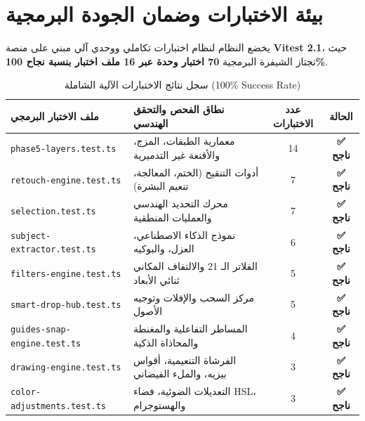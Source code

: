 \documentclass[12pt,a4paper]{report}
\begin{document}
\chapter{بيئة الاختبارات وضمان الجودة البرمجية}

يخضع النظام لنظام اختبارات تكاملي ووحدي آلي مبني على منصة \textbf{Vitest 2.1}، حيث تجتاز الشيفرة البرمجية \textbf{70 اختبار وحدة عبر 16 ملف اختبار بنسبة نجاح 100\%}.

\begin{table}[htbp]
    \centering
    \caption{سجل نتائج الاختبارات الآلية الشاملة (100\% Success Rate)}
    \label{tab:tests-matrix}
    \begin{tabularx}{\textwidth}{l X c c}
        \toprule
        \textbf{ملف الاختبار البرمجي} & \textbf{نطاق الفحص والتحقق الهندسي} & \textbf{عدد الاختبارات} & \textbf{الحالة} \\
        \midrule
        \texttt{phase5-layers.test.ts} & معمارية الطبقات، المزج، والأقنعة غير التدميرية & 14 & \textcolor{StudioGreen}{\textbf{✅ ناجح}} \\
        \texttt{retouch-engine.test.ts} & أدوات التنقيح (الختم، المعالجة، تنعيم البشرة) & 7 & \textcolor{StudioGreen}{\textbf{✅ ناجح}} \\
        \texttt{selection.test.ts} & محرك التحديد الهندسي والعمليات المنطقية & 7 & \textcolor{StudioGreen}{\textbf{✅ ناجح}} \\
        \texttt{subject-extractor.test.ts} & نموذج الذكاء الاصطناعي، العزل، والبوكيه & 6 & \textcolor{StudioGreen}{\textbf{✅ ناجح}} \\
        \texttt{filters-engine.test.ts} & الفلاتر الـ 21 والالتفاف المكاني ثنائي الأبعاد & 5 & \textcolor{StudioGreen}{\textbf{✅ ناجح}} \\
        \texttt{smart-drop-hub.test.ts} & مركز السحب والإفلات وتوجيه الأصول & 5 & \textcolor{StudioGreen}{\textbf{✅ ناجح}} \\
        \texttt{guides-snap-engine.test.ts} & المساطر التفاعلية والمغنطة والمحاذاة الذكية & 4 & \textcolor{StudioGreen}{\textbf{✅ ناجح}} \\
        \texttt{drawing-engine.test.ts} & الفرشاة التنعيمية، أقواس بيزيه، والملء الفيضاني & 3 & \textcolor{StudioGreen}{\textbf{✅ ناجح}} \\
        \texttt{color-adjustments.test.ts} & التعديلات الضوئية، فضاء HSL، والهستوجرام & 3 & \textcolor{StudioGreen}{\textbf{✅ ناجح}} \\

\end{tabularx}
\end{table}
\end{document}
